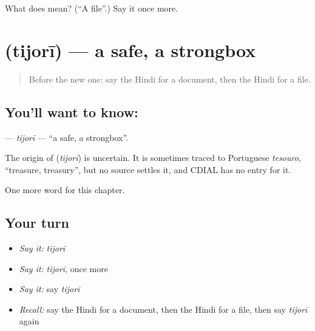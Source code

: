 \begin{tcolorbox}[breakable,colback=teal!4,colframe=teal!35!black,title={Before you move on}]
What does  mean? (\textquotedblleft{}A file\textquotedblright{}.) Say it once more.
\end{tcolorbox}
\section[\texorpdfstring{\hi{तिजोरी} (tijorī)}{तिजोरी (tijorī)}]{ (tijorī) — a safe, a strongbox}

\label{lesson:HI-C250-tijori}



\begin{quote}
Before the new one: say the Hindi for a document, then the Hindi for a file.
\end{quote}

\subsection*{You'll want to know: }
\textbf{} — \emph{tijorī} — \textquotedblleft{}a safe, a strongbox\textquotedblright{}.

\begin{cousinweb}
The origin of \textbf{} (\emph{tijorī}) is uncertain. It is sometimes traced to Portuguese \emph{tesouro}, \textquotedblleft{}treasure, treasury\textquotedblright{}, but no source settles it, and CDIAL has no entry for it.
\end{cousinweb}

\begin{grammarlens}[title={What you've built}]
One more word for this chapter.
\end{grammarlens}

\subsection*{Your turn}
\begin{itemize}
\raggedright
  \item \emph{Say it:} \emph{tijorī}
  \item \emph{Say it:} \emph{tijorī}, once more
  \item \emph{Say it:} say \emph{tijorī}
  \item \emph{Recall:} say the Hindi for a document, then the Hindi for a file, then say \emph{tijorī} again
\end{itemize}

